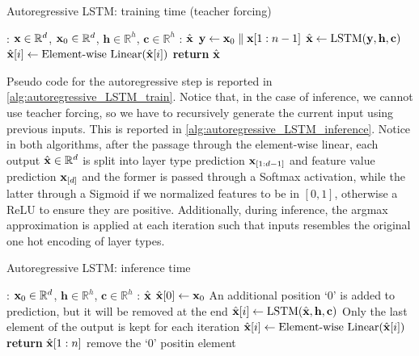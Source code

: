 \documentclass[12pt]{article}
\begin{document}
\begin{algorithm}
    \label{alg:autoregressive_LSTM_train}
    \caption{Autoregressive LSTM: training time (teacher forcing)}
    \begin{algorithmic}
        \Input: \(\textbf{x} \in \mathbb{R}^d\), \(\textbf{x}_0 \in \mathbb{R}^d\), \(\mathbf{h} \in \mathbb{R}^h\), \(\mathbf{c} \in \mathbb{R}^h\)
        \Output: \(\hat{\textbf{x}}\)
        \State \(\mathbf{y} \leftarrow \textbf{x}_0 \parallel \textbf{x}[1:n-1]\)  
        \State \(\hat{\textbf{x}} \leftarrow \text{LSTM}(\mathbf{y}, \mathbf{h}, \mathbf{c})\)
            \State \(\hat{\textbf{x}}[i] \leftarrow \text{Element-wise Linear}(\hat{\textbf{x}}[i])\)
        \EndFor
        \State \textbf{return} \(\hat{\textbf{x}}\)
    \end{algorithmic}
\end{algorithm}

Pseudo code for the autoregressive step is reported in \ref{alg:autoregressive_LSTM_train}. Notice that, in the case of inference, we cannot use teacher forcing, so we have to recursively generate the current input using previous inputs. This is reported in \ref{alg:autoregressive_LSTM_inference}. Notice in both algorithms, after the passage through the element-wise linear, each output \(\hat{\textbf{x}} \in \mathbb{R}^d\) is split into layer type prediction \(\textbf{x}_{[1:d-1]}\) and feature value prediction \(\textbf{x}_{[d]}\) and the former is passed through a Softmax activation, while the latter through a Sigmoid if we normalized features to be in \([0,1]\), otherwise a ReLU to ensure they are positive. Additionally, during inference, the argmax approximation is applied at each iteration such that inputs resembles the original one hot encoding of layer types.

\begin{algorithm}
    \label{alg:autoregressive_LSTM_inference}
    \caption{Autoregressive LSTM: inference time}
    \begin{algorithmic}
        \Input: \(\textbf{x}_0 \in \mathbb{R}^d\), \(\mathbf{h} \in \mathbb{R}^h\), \(\mathbf{c} \in \mathbb{R}^h\)
        \Output: \(\hat{\textbf{x}}\)
        \State \(\hat{\textbf{x}}[0] \leftarrow \textbf{x}_0\) \Comment An additional position `0' is added to prediction, but it will be removed at the end
            \State \(\hat{\textbf{x}}[i] \leftarrow \text{LSTM}(\hat{\textbf{x}}, \mathbf{h}, \mathbf{c})\) \Comment Only the last element of the output is kept for each iteration
            \State \(\hat{\textbf{x}}[i] \leftarrow \text{Element-wise Linear}(\hat{\textbf{x}}[i])\)
        \EndFor
        \State \textbf{return} \(\hat{\textbf{x}}[1:n]\) \Comment remove the `0' positin element
    \end{algorithmic}
\end{algorithm}
\end{document}

